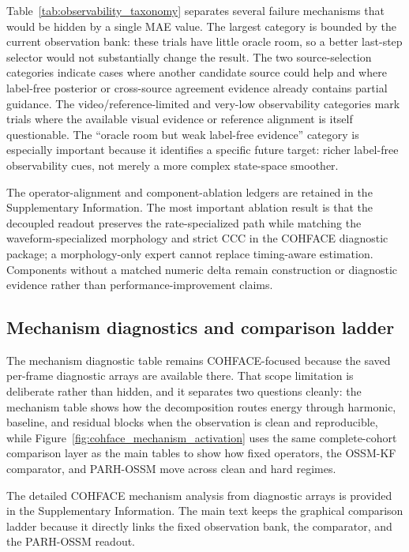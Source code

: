 \documentclass[fleqn,10pt]{wlscirep}
\begin{document}
Table~\ref{tab:observability_taxonomy} separates several failure mechanisms
that would be hidden by a single MAE value. The largest category is bounded by
the current observation bank: these trials have little oracle room, so a better
last-step selector would not substantially change the result. The two
source-selection categories indicate cases where another candidate source could
help and where label-free posterior or cross-source agreement evidence already
contains partial guidance. The video/reference-limited and very-low
observability categories mark trials where the available visual evidence or
reference alignment is itself questionable. The ``oracle room but weak
label-free evidence'' category is especially important because it identifies a
specific future target: richer label-free observability cues, not merely a more
complex state-space smoother.

The operator-alignment and component-ablation ledgers are retained in the
Supplementary Information. The most important ablation result is that the
decoupled readout preserves the rate-specialized path while matching the
waveform-specialized morphology and strict CCC in the COHFACE diagnostic
package; a morphology-only expert cannot replace timing-aware estimation.
Components without a matched numeric delta remain construction or diagnostic
evidence rather than performance-improvement claims.

\subsection*{Mechanism diagnostics and comparison ladder}
The mechanism diagnostic table remains COHFACE-focused because the saved
per-frame diagnostic arrays are available there. That scope limitation is
deliberate rather than hidden, and it separates two questions cleanly: the
mechanism table shows how the decomposition routes
energy through harmonic, baseline, and residual blocks when the observation is
clean and reproducible, while Figure~\ref{fig:cohface_mechanism_activation}
uses the same complete-cohort comparison layer as the main tables to show how fixed
operators, the OSSM-KF comparator, and PARH-OSSM move across clean
and hard regimes.

The detailed COHFACE mechanism analysis from diagnostic arrays is provided
in the Supplementary Information. The main text keeps the graphical comparison
ladder because it directly links the fixed observation bank, the comparator, and
the PARH-OSSM readout.
\end{document}
